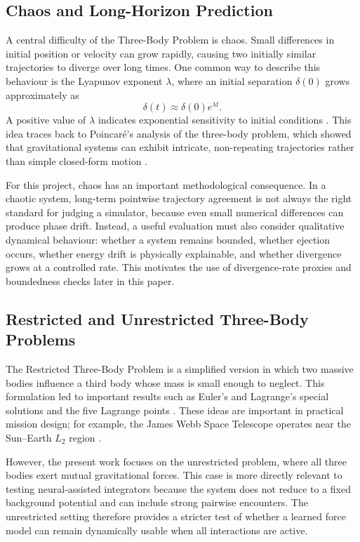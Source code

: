\documentclass[12pt]{article}
\begin{document}
\subsection{Chaos and Long-Horizon Prediction}
\label{sec:chaos}

A central difficulty of the Three-Body Problem is chaos. Small differences in initial position
or velocity can grow rapidly, causing two initially similar trajectories to diverge over long
times. One common way to describe this behaviour is the Lyapunov exponent $\lambda$, where
an initial separation $\delta(0)$ grows approximately as
\begin{equation}
\delta(t) \approx \delta(0)e^{\lambda t}.
\end{equation}
A positive value of $\lambda$ indicates exponential sensitivity to initial conditions \cite{ott2002chaos}.
This idea traces back to Poincar\'e's analysis of the three-body problem, which showed that
gravitational systems can exhibit intricate, non-repeating trajectories rather than simple
closed-form motion \cite{poincare1890sur}.

For this project, chaos has an important methodological consequence. In a chaotic system,
long-term pointwise trajectory agreement is not always the right standard for judging a
simulator, because even small numerical differences can produce phase drift. Instead, a
useful evaluation must also consider qualitative dynamical behaviour: whether a system
remains bounded, whether ejection occurs, whether energy drift is physically explainable,
and whether divergence grows at a controlled rate. This motivates the use of divergence-rate
proxies and boundedness checks later in this paper.

\subsection{Restricted and Unrestricted Three-Body Problems}

The Restricted Three-Body Problem is a simplified version in which two massive bodies
influence a third body whose mass is small enough to neglect. This formulation led to
important results such as Euler's and Lagrange's special solutions and the five Lagrange
points \cite{bistafa2021euler,lagrange1772essai}. These ideas are important in practical mission
design; for example, the James Webb Space Telescope operates near the Sun--Earth $L_2$
region \cite{gardner2006james}.

However, the present work focuses on the unrestricted problem, where all three bodies exert
mutual gravitational forces. This case is more directly relevant to testing neural-assisted
integrators because the system does not reduce to a fixed background potential and can
include strong pairwise encounters. The unrestricted setting therefore provides a stricter
test of whether a learned force model can remain dynamically usable when all interactions
are active.
\end{document}
